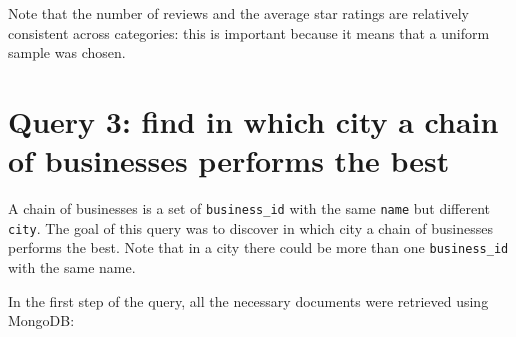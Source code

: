 \documentclass{Configuration_Files/PoliMi3i_thesis}
\begin{document}
Note that the number of reviews and the average star ratings are relatively consistent across categories: this is important because it means that a uniform sample was chosen. 

\section{Query 3: find in which city a chain of businesses performs the best}
A chain of businesses is a set of \texttt{business\_id} with the same \texttt{name} but different \texttt{city}. The goal of this query was to discover in which city a chain of businesses performs the best. Note that in a city there could be more than one \texttt{business\_id} with the same name.

In the first step of the query, all the necessary documents were retrieved using MongoDB:
\end{document}
